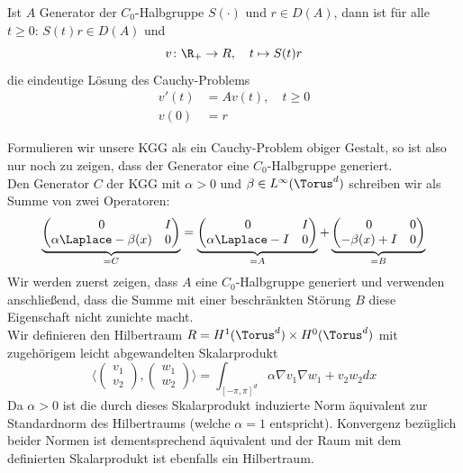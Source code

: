 \begin{maththeorem}
Ist $A$ Generator der $C_0$-Halbgruppe $S(\cdot)$ und $r\in D(A)$, dann ist für alle $t\ge 0\colon \,S(t)r\in D(A)$ und
\[v\colon \R_+\to R,\quad t\mapsto S(t)r\]
die eindeutige Lösung des Cauchy-Problems
\begin{equation}
\begin{split}
v'(t)&=Av(t),\quad t\ge 0\\
v(0)&=r
\end{split}
\end{equation}
\end{maththeorem}
Formulieren wir unsere KGG als ein Cauchy-Problem obiger Gestalt, so ist also nur noch zu zeigen, dass der Generator eine $C_0$-Halbgruppe generiert.\\
Den Generator $C$ der KGG mit $\alpha>0$ und $\beta\in L^\infty(\Torus^d)$ schreiben wir als Summe von zwei Operatoren:
\[\underbrace{\begin{pmatrix}0 & I\\ \alpha\Laplace -\beta(x) & 0\end{pmatrix}}_{=C}
=\underbrace{\begin{pmatrix}0 & I\\ \alpha\Laplace-I & 0\end{pmatrix}}_{=A}
+\underbrace{\begin{pmatrix}0 & 0\\ -\beta(x)+I & 0\end{pmatrix}}_{=B}\]
Wir werden zuerst zeigen, dass $A$ eine $C_0$-Halbgruppe generiert und verwenden anschließend, dass die Summe mit einer beschränkten Störung $B$ diese Eigenschaft nicht zunichte macht.\\[0.2cm]
Wir definieren den Hilbertraum $R=H^1(\Torus^d)\times H^0(\Torus^d)$ mit zugehörigem leicht abgewandelten Skalarprodukt 
\[\langle \begin{pmatrix}v_1\\v_2\end{pmatrix}, \begin{pmatrix}w_1\\w_2\end{pmatrix}\rangle =\int_{[-\pi,\pi]^d}\alpha \nabla v_1\nabla w_1+ v_2w_2dx\]
Da $\alpha>0$ ist die durch dieses Skalarprodukt induzierte Norm äquivalent zur Standardnorm des Hilbertraums (welche $\alpha=1$ entspricht). Konvergenz bezüglich beider Normen ist dementsprechend äquivalent und der Raum mit dem definierten Skalarprodukt ist ebenfalls ein Hilbertraum.\\

